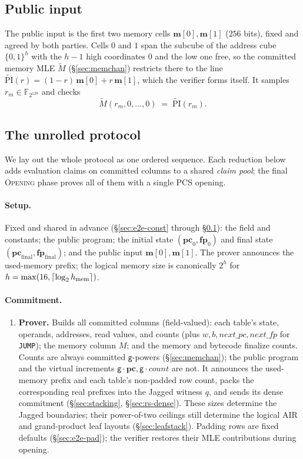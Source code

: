 \documentclass[11pt]{article}
\newcommand{\F}{\mathbb{F}}
\newcommand{\cube}[1]{\{0,1\}^{#1}}
\newcommand{\gen}{\mathsf{g}}
\newcommand{\pc}{\mathbf{pc}}
\newcommand{\fp}{\mathbf{fp}}
\newcommand{\mem}{\mathbf{m}}
\newcommand{\cnt}{\mathit{count}}
\begin{document}
\subsection{Public input}\label{sec:e2e-pi}

The public input is the first two memory cells $\mem[0],\mem[1]$ ($256$ bits), fixed and agreed by both parties. Cells $0$ and $1$ span the subcube of the address cube $\cube h$ with the $h-1$ high coordinates $0$ and the low one free, so the committed memory MLE $\widetilde M$ (\S\ref{sec:memchan}) restricts there to the line $\widetilde{\mathrm{PI}}(r)=(1-r)\,\mem[0]+r\,\mem[1]$, which the verifier forms itself. It samples $r_m\in\F_{2^{128}}$ and checks
\[
  \widetilde M(r_m,0,\dots,0)\;=\;\widetilde{\mathrm{PI}}(r_m).
\]

\subsection{The unrolled protocol}\label{sec:e2e-unrolled}

We lay out the whole protocol as one ordered sequence. Each reduction below adds evaluation claims on committed columns to a shared \emph{claim pool}; the final \textsc{Opening} phase proves all of them with a single PCS opening.

\paragraph{Setup.} Fixed and shared in advance (\S\ref{sec:e2e-const} through \S\ref{sec:e2e-pi}): the field and constants; the public program; the initial state $(\pc_0,\fp_0)$ and final state $(\pc_{\mathrm{final}},\fp_{\mathrm{final}})$; and the public input $\mem[0],\mem[1]$.  The prover announces the used-memory prefix; the logical memory size is canonically $2^h$ for $h=\max(16,\lceil\log_2 h_{\rm mem}\rceil)$.

\paragraph{Commitment.}
\begin{enumerate}
\item \textbf{Prover.} Builds all committed columns (field-valued): each table's state, operands, addresses, read values, and counts (plus $w,b,\mathit{next\_pc},\mathit{next\_fp}$ for \texttt{JUMP}); the memory column $M$; and the memory and bytecode finalize counts. Counts are always committed $\gen$-powers (\S\ref{sec:memchan}); the public program and the virtual increments $\gen\cdot\pc,\gen\cdot\cnt$ are not. It announces the used-memory prefix and each table's non-padded row count, packs the corresponding real prefixes into the Jagged witness $q$, and sends its dense commitment (\S\ref{sec:stacking}, \S\ref{sec:rs-dense}).  These sizes determine the Jagged boundaries; their power-of-two ceilings still determine the logical AIR and grand-product leaf layouts (\S\ref{sec:leafstack}). Padding rows are fixed defaults (\S\ref{sec:e2e-pad}); the verifier restores their MLE contributions during opening.
\end{enumerate}
\end{document}
